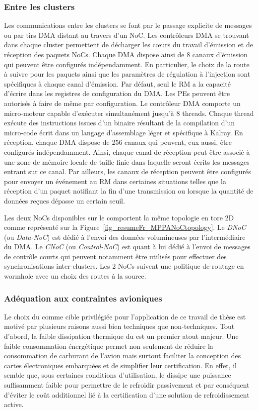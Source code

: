 \documentclass[main.tex]{subfiles}
\begin{document}
\subsubsection{Entre les clusters}
Les communications entre les clusters se font par le passage explicite de messages ou par tirs DMA distant au travers d'un NoC. Les contrôleurs DMA se trouvant dans chaque cluster permettent de décharger les c\oe{}urs du travail d'émission et de réception des paquets NoCs. Chaque DMA dispose ainsi de 8 canaux d'émission qui peuvent être configurés indépendamment. En particulier, le choix de la route à suivre pour les paquets ainsi que les paramètres de régulation à l'injection sont spécifiques à chaque canal d'émission. Par défaut, seul le RM a la capacité d'écrire dans les registres de configuration du DMA. Les PEs peuvent être autorisés à faire de même par configuration. Le contrôleur DMA comporte un micro-moteur capable d'exécuter simultanément jusqu'à 8 threads. Chaque thread exécute des instructions issues d'un binaire résultant de la compilation d'un micro-code écrit dans un langage d'assemblage léger et spécifique à Kalray. En réception, chaque DMA dispose de 256 canaux qui peuvent, eux aussi, être configurés indépendamment. Ainsi, chaque canal de réception peut être associé à une zone de mémoire locale de taille finie dans laquelle seront écrits les messages entrant sur ce canal. Par ailleurs, les canaux de réception peuvent être configurés pour envoyer un événement au RM dans certaines situations telles que la réception d'un paquet notifiant la fin d'une transmission ou lorsque la quantité de données reçues dépasse un certain seuil.

Les deux NoCs disponibles sur le \mppalong comportent la même topologie en tore 2D comme représenté sur la Figure~\ref{fig_resumeFr_MPPANoCtopology}. Le \emph{DNoC} (ou \emph{Data-NoC}) est dédié à l'envoi des données volumineuses par l'intermédiaire du DMA. Le \emph{CNoC} (ou \emph{Control-NoC}) est quant à lui dédié à l'envoi de messages de contrôle courts qui peuvent notamment être utilisés pour effectuer des synchronisations inter-clusters. Les 2 NoCs suivent une politique de routage en wormhole avec un choix des routes à la source.


\subsubsection{Adéquation aux contraintes avioniques}
Le choix du \mppalong comme cible privilégiée pour l'application de ce travail de thèse est motivé par plusieurs raisons aussi bien techniques que non-techniques. Tout d'abord, la faible dissipation thermique du \mppalong est un premier atout majeur. Une faible consommation énergétique permet non seulement de réduire la consommation de carburant de l'avion mais surtout faciliter la conception des cartes électroniques embarquées et de simplifier leur certification. En effet, il semble que, sous certaines conditions d'utilisation, le \mppalong dissipe une puissance suffisamment faible pour permettre de le refroidir passivement et par conséquent d'éviter le coût additionnel lié à la certification d'une solution de refroidissement active.
\end{document}

